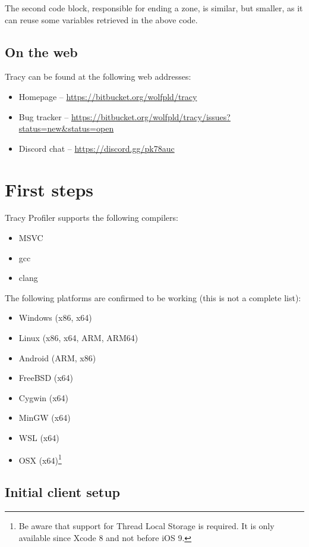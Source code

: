 \documentclass[hidelinks,titlepage,a4paper]{article}
\begin{document}
The second code block, responsible for ending a zone, is similar, but smaller, as it can reuse some variables retrieved in the above code.

\subsection{On the web}

Tracy can be found at the following web addresses:

\begin{itemize}
\item Homepage -- \url{https://bitbucket.org/wolfpld/tracy}
\item Bug tracker -- \url{https://bitbucket.org/wolfpld/tracy/issues?status=new&status=open}
\item Discord chat -- \url{https://discord.gg/pk78auc}
\end{itemize}

\section{First steps}

Tracy Profiler supports the following compilers:

\begin{itemize}
\item MSVC
\item gcc
\item clang
\end{itemize}

The following platforms are confirmed to be working (this is not a complete list):

\begin{itemize}
\item Windows (x86, x64)
\item Linux (x86, x64, ARM, ARM64)
\item Android (ARM, x86)
\item FreeBSD (x64)
\item Cygwin (x64)
\item MinGW (x64)
\item WSL (x64)
\item OSX (x64)\footnote{Be aware that support for Thread Local Storage is required. It is only available since Xcode 8 and not before iOS 9.}
\end{itemize}

\subsection{Initial client setup}
\end{document}
